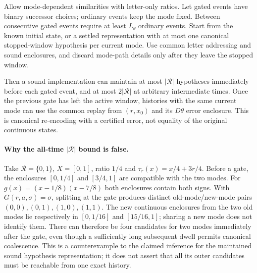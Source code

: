 \begin{proposition}
\label{III:M:prop:dwell-coalescence}
Allow mode-dependent similarities with letter-only ratios. Let gated
events have binary successor choices; ordinary events keep the mode fixed.
Between consecutive gated events require at least $L_\theta$ ordinary
events. Start from the known initial state, or a settled representation
with at most one canonical stopped-window hypothesis per current mode.
Use common letter addressing and sound enclosures, and discard mode-path
details only after they leave the stopped window.

Then a sound implementation can maintain at most $|\mathcal R|$
hypotheses immediately before each gated event, and at most
$2|\mathcal R|$ at arbitrary intermediate times. Once the previous gate
has left the active window, histories with the same current mode can use
the common replay from $(r,x_0)$ and its $D\theta$ error enclosure.
This is canonical re-encoding with a certified error, not equality of
the original continuous states.
\end{proposition}


\paragraph{Why the all-time $|\mathcal R|$ bound is false.}
Take $\mathcal R=\{0,1\}$, $X=[0,1]$, ratio $1/4$ and
$\tau_r(x)=x/4+3r/4$. Before a gate, the enclosures
$[0,1/4]$ and $[3/4,1]$ are compatible with the two modes.
For $g(x)=(x-1/8)(x-7/8)$ both enclosures contain both signs.
With $G(r,a,\sigma)=\sigma$, splitting at the gate produces distinct
old-mode/new-mode pairs $(0,0),(0,1),(1,0),(1,1)$.
The new continuous enclosures from the two old modes lie respectively
in $[0,1/16]$ and $[15/16,1]$; sharing a new mode does not identify them.
There can therefore be four candidates for two modes immediately after
the gate, even though a sufficiently long subsequent dwell permits
canonical coalescence. This is a counterexample to the claimed inference
for the maintained sound hypothesis representation; it does not assert
that all its outer candidates must be reachable from one exact history.

